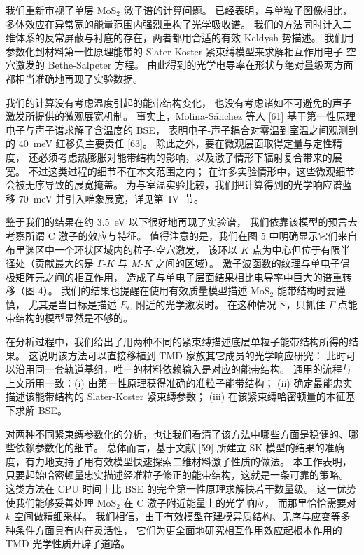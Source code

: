 \documentclass[11pt,a4paper]{ctexart}
\begin{document}
我们重新审视了单层 MoS$_2$ 激子谱的计算问题。
已经表明，与单粒子图像相比，多体效应在异常宽的能量范围内强烈重构了光学吸收谱。
我们的方法同时计入二维体系的反常屏蔽与衬底的存在，两者都用合适的有效 Keldysh 势描述。
我们用参数化到材料第一性原理能带的 Slater-Koster 紧束缚模型来求解相互作用电子-空穴激发的 Bethe-Salpeter 方程。
由此得到的光学电导率在形状与绝对量级两方面都相当准确地再现了实验数据。

我们的计算没有考虑温度引起的能带结构变化，
也没有考虑诸如不可避免的声子激发所提供的微观展宽机制。
事实上，Molina-Sánchez 等人 [61] 基于第一性原理电子与声子谱求解了含温度的 BSE，
表明电子-声子耦合对零温到室温之间观测到的 40~meV 红移负主要责任 [63]。
除此之外，要在微观层面取得定量与定性精度，
还必须考虑热膨胀对能带结构的影响，以及激子情形下辐射复合带来的展宽。
不过这类过程的细节不在本文范围之内；
在许多实验情形中，这些微观细节会被无序导致的展宽掩盖。
为与室温实验比较，我们把计算得到的光学响应谱蓝移 70~meV 并引入唯象展宽，详见第~IV~节。

鉴于我们的结果在约 3.5~eV 以下很好地再现了实验谱，
我们依靠该模型的预言去考察所谓 C 激子的效应与特征。
值得注意的是，我们在图 5 中明确显示它们来自布里渊区中一个环状区域内的粒子-空穴激发，
该环以 $K$ 点为中心但位于有限半径处（贡献最大的是 $\Gamma$-$K$ 与 $M$-$K$ 之间的区域）。
激子波函数的纹理与单电子偶极矩阵元之间的相互作用，
造成了与单电子层面结果相比电导率中巨大的谱重转移（图 4）。
我们的结果也提醒在使用有效质量模型描述 MoS$_2$ 能带结构时要谨慎，
尤其是当目标是描述 $E_C$ 附近的光学激发时。
在这种情况下，只抓住 $\Gamma$ 点能带结构的模型显然是不够的。

在分析过程中，我们给出了用两种不同的紧束缚描述底层单粒子能带结构所得的结果。
这说明该方法可以直接移植到 TMD 家族其它成员的光学响应研究：
此时可以沿用同一套轨道基组，唯一的材料依赖输入是对应的能带结构。
通用的流程与上文所用一致：(i) 由第一性原理获得准确的准粒子能带结构；
(ii) 确定最能忠实描述该能带结构的 Slater-Koster 紧束缚参数；
(iii) 在该紧束缚哈密顿量的本征基下求解 BSE。

对两种不同紧束缚参数化的分析，也让我们看清了该方法中哪些方面是稳健的、哪些依赖参数化的细节。
总体而言，基于文献 [59] 所建立 SK 模型的结果的准确度，有力地支持了用有效模型快速探索二维材料激子性质的做法。
本工作表明，只要起始哈密顿量忠实描述经准粒子修正的能带结构，这就是一条可靠的策略。
这类方法在 CPU 时间上比 BSE 的完全第一性原理求解快若干数量级。
这一优势使我们能够妥善处理 MoS$_2$ 在 C 激子附近能量上的光学响应，
而那里恰恰需要对 $k$ 空间做精细采样。
我们相信，由于有效模型在建模异质结构、无序与应变等多种条件方面具有内在灵活性，
它们为更全面地研究相互作用效应起根本作用的 TMD 光学性质开辟了道路。
\end{document}
